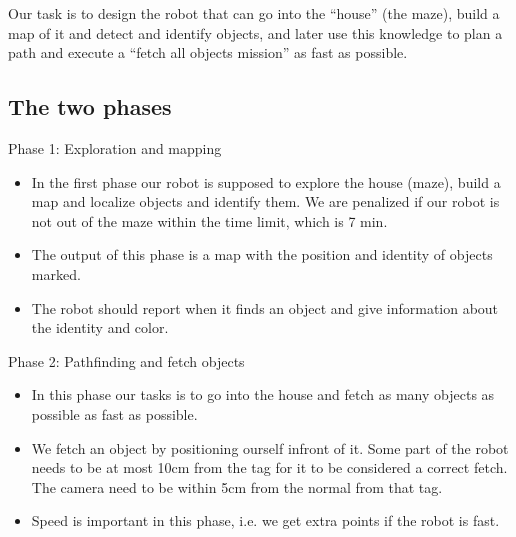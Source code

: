 
Our task is to design the robot that can go into the ``house'' (the maze), build a map of it and detect and identify objects, and later use this knowledge to plan a path and execute a ``fetch all objects mission'' as fast as possible.

\subsection{The two phases}
Phase 1: Exploration and mapping
\begin{itemize}
\item In the first phase our robot is supposed to explore the house (maze), build a map and localize objects and identify them. We are penalized if our robot is not out of the maze within the time limit, which is 7 min.
\item The output of this phase is a map with the position and identity of objects marked.
\item The robot should report when it finds an object and give information about the identity and color.
\end{itemize}
Phase 2: Pathfinding and fetch objects
\begin{itemize}
\item In this phase our tasks is to go into the house and fetch as many objects as possible as fast as possible.
\item We fetch an object by positioning ourself infront of it. Some part of the robot needs to be at most 10cm from the tag for it to be considered a correct fetch. The camera need to be within 5cm from the normal from that tag.
\item Speed is important in this phase, i.e. we get extra points if the robot is fast.
\end{itemize}